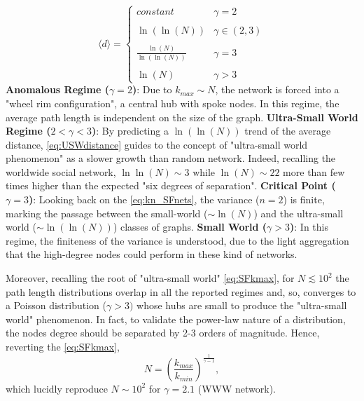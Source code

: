 \documentclass[a4paper,12pt,twoside]{book} %
\theoremstyle{definition}
\begin{document}
\begin{equation}
	\langle d \rangle = 
	\begin{cases}
		constant & \gamma = 2 \\ \\
		\ln(\ln(N)) & \gamma \in (2,3) \\ \\
		\frac{\ln(N)}{\ln(\ln(N))} & \gamma = 3 \\ \\
		\ln(N) & \gamma > 3
	\end{cases}
	\label{eq:USWdistance}
\end{equation}
\newline
\textbf{Anomalous Regime ($\gamma = 2$)}: Due to $k_{max} \sim N$, the network is forced into a "wheel rim configuration", a central hub with spoke nodes. In this regime, the average path length is independent on the size of the graph.
\newline
\textbf{Ultra-Small World Regime ($2 < \gamma < 3$)}: By predicting a $\ln(\ln(N))$ trend of the average distance, \autoref{eq:USWdistance} guides to the concept of "ultra-small world phenomenon" as a slower growth than random network. Indeed, recalling the worldwide social network, \(\ln\ln(N) \sim 3 \text{ while } \ln(N) \sim 22\) more than few times higher than the expected "six degrees of separation".
\newline
\textbf{Critical Point ($\gamma = 3$)}: Looking back on the \autoref{eq:kn_SFnets}, the variance ($n=2$) is finite, marking the passage between the small-world ($\sim \ln(N)$) and the ultra-small world ($\sim \ln(\ln(N))$) classes of graphs.
\newline
\textbf{Small World ($\gamma > 3$)}:
In this regime, the finiteness of the variance is understood, due to the light aggregation that the high-degree nodes could perform in these kind of networks.

Moreover, recalling the root of "ultra-small world" \autoref{eq:SFkmax}, for $N \lesssim 10^2$ the path length distributions overlap in all the reported regimes and, so, converges to a Poisson distribution ($\gamma > 3)$ whose hubs are small to produce the "ultra-small world" phenomenon. In fact, to validate the power-law nature of a distribution, the nodes degree should be separated by 2-3 orders of magnitude. Hence, reverting the \autoref{eq:SFkmax},
\[N = \left(\frac{k_{max}}{k_{min}} \right)^\frac{1}{\gamma -1},\]
which lucidly reproduce $N \sim 10^2$ for $\gamma = 2.1$ (WWW network).
\end{document}
